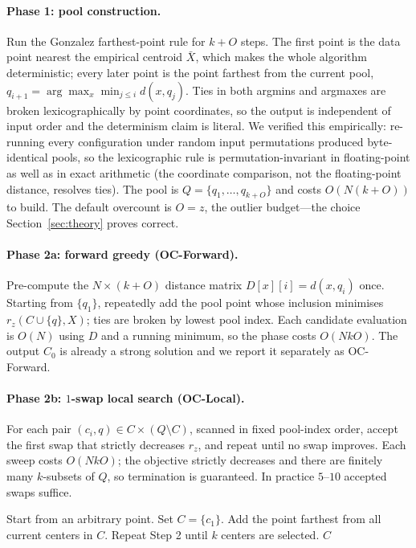 \documentclass[twoside,leqno,twocolumn]{article}
\newcommand{\rz}{r_z}
\begin{document}
\paragraph{Phase 1: pool construction.}
Run the Gonzalez farthest-point rule for $k+O$ steps. The first point
is the data point nearest the empirical centroid $\bar{X}$, which
makes the whole algorithm deterministic; every later point is the
point farthest from the current pool,
$q_{i+1}=\arg\max_x \min_{j\le i} d(x,q_j)$. Ties in both argmins
and argmaxes are broken lexicographically by point coordinates, so the
output is independent of input order and the determinism claim is
literal. We verified this empirically: re-running every configuration
under random input permutations produced byte-identical pools, so the
lexicographic rule is permutation-invariant in floating-point as well
as in exact arithmetic (the coordinate comparison, not the
floating-point distance, resolves ties). The pool is
$Q=\{q_1,\dots,q_{k+O}\}$ and costs $O(N(k{+}O))$ to build. The
default overcount is $O=z$, the outlier budget---the choice
Section~\ref{sec:theory} proves correct.

\paragraph{Phase 2a: forward greedy (OC-Forward).}
Pre-compute the $N\times(k{+}O)$ distance matrix $D[x][i]=d(x,q_i)$
once. Starting from $\{q_1\}$, repeatedly add the pool point whose
inclusion minimises $\rz(C\cup\{q\},X)$; ties are broken by lowest
pool index. Each candidate evaluation is $O(N)$ using $D$ and a
running minimum, so the phase costs $O(NkO)$. The output $C_0$ is
already a strong solution and we report it separately as OC-Forward.

\paragraph{Phase 2b: $1$-swap local search (OC-Local).}
For each pair $(c_i,q)\in C\times(Q\setminus C)$, scanned in fixed
pool-index order, accept the first swap that strictly decreases
$\rz$, and repeat until no swap improves. Each sweep costs $O(NkO)$;
the objective strictly decreases and there are finitely many
$k$-subsets of $Q$, so termination is guaranteed. In practice
$5$--$10$ accepted swaps suffice.

\begin{algorithm}[t]
\caption{Gonzalez$(X, k)$}
\label{alg:gonzalez}
\begin{algorithmic}[1]
\State Start from an arbitrary point. Set $C = \{c_1\}$.
\State Add the point farthest from all current centers in $C$.
\State Repeat Step 2 until $k$ centers are selected.
\State \Return $C$
\end{algorithmic}
\end{algorithm}
\end{document}
